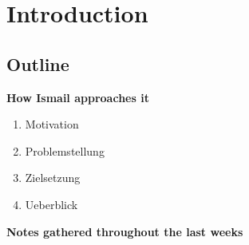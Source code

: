 \section{Introduction}
\label{sec:introduction}


\subsection{Outline}

	\textbf{How Ismail approaches it}
		\begin{enumerate}
		\item Motivation
		\item Problemstellung
		\item Zielsetzung
		\item Ueberblick
		\end{enumerate}



	\textbf{Notes gathered throughout the last weeks}
  
